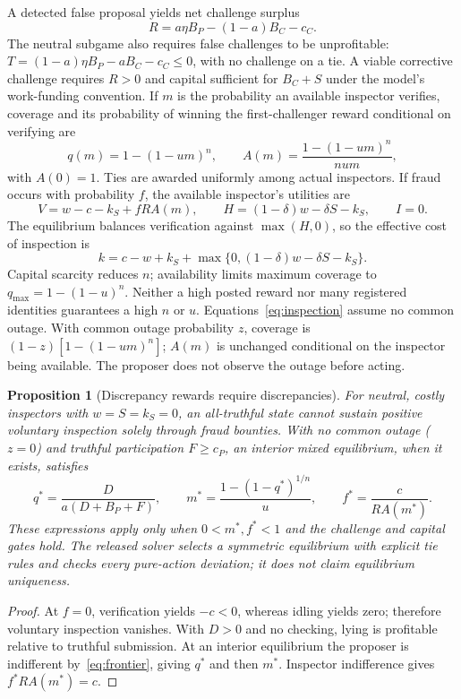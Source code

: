 \documentclass[10pt]{article}
\newtheorem{proposition}{Proposition}
\begin{document}
A detected false proposal yields net challenge surplus
\[
R=a\eta B_P-(1-a)B_C-c_C.
\]
The neutral subgame also requires false challenges to be unprofitable: $T=(1-a)\eta B_P-aB_C-c_C\leq0$, with no challenge on a tie. A viable corrective challenge requires $R>0$ and capital sufficient for $B_C+S$ under the model's work-funding convention. If $m$ is the probability an available inspector verifies, coverage and its probability of winning the first-challenger reward conditional on verifying are
\begin{equation}
q(m)=1-(1-um)^n,\qquad
A(m)=\frac{1-(1-um)^n}{num},
\label{eq:inspection}
\end{equation}
with $A(0)=1$. Ties are awarded uniformly among actual inspectors. If fraud occurs with probability $f$, the available inspector's utilities are
\[
V=w-c-k_S+fR A(m),\qquad
H=(1-\delta)w-\delta S-k_S,\qquad I=0.
\]
The equilibrium balances verification against $\max(H,0)$, so the effective cost of inspection is
\[
k=c-w+k_S+\max\{0,(1-\delta)w-\delta S-k_S\}.
\]
Capital scarcity reduces $n$; availability limits maximum coverage to $q_{\max}=1-(1-u)^n$. Neither a high posted reward nor many registered identities guarantees a high $n$ or $u$. Equations~\eqref{eq:inspection} assume no common outage. With common outage probability $z$, coverage is $(1-z)[1-(1-um)^n]$; $A(m)$ is unchanged conditional on the inspector being available. The proposer does not observe the outage before acting.

\begin{proposition}[Discrepancy rewards require discrepancies]
\label{prop:rare_fraud}
For neutral, costly inspectors with $w=S=k_S=0$, an all-truthful state cannot sustain positive voluntary inspection solely through fraud bounties. With no common outage ($z=0$) and truthful participation $F\geq c_P$, an interior mixed equilibrium, when it exists, satisfies
\[
q^*=\frac{D}{a(D+B_P+F)},\qquad
m^*=\frac{1-(1-q^*)^{1/n}}{u},\qquad
f^*=\frac{c}{R A(m^*)}.
\]
These expressions apply only when $0<m^*,f^*<1$ and the challenge and capital gates hold. The released solver selects a symmetric equilibrium with explicit tie rules and checks every pure-action deviation; it does not claim equilibrium uniqueness.
\end{proposition}
\begin{proof}
At $f=0$, verification yields $-c<0$, whereas idling yields zero; therefore voluntary inspection vanishes. With $D>0$ and no checking, lying is profitable relative to truthful submission. At an interior equilibrium the proposer is indifferent by~\eqref{eq:frontier}, giving $q^*$ and then $m^*$. Inspector indifference gives $f^*RA(m^*)=c$.
\end{proof}
\end{document}
